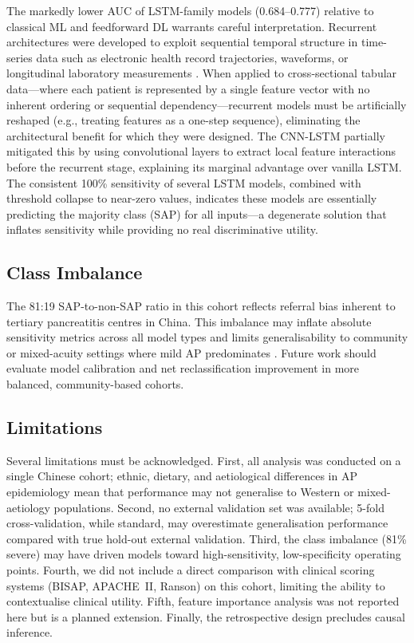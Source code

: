 \documentclass[12pt,a4paper]{article}
\begin{document}
The markedly lower AUC of LSTM-family models (0.684--0.777) relative to classical ML and feedforward DL warrants careful interpretation. Recurrent architectures were developed to exploit sequential temporal structure in time-series data such as electronic health record trajectories, waveforms, or longitudinal laboratory measurements \citep{Rajpurkar2022, Shickel2018}. When applied to cross-sectional tabular data—where each patient is represented by a single feature vector with no inherent ordering or sequential dependency—recurrent models must be artificially reshaped (e.g., treating features as a one-step sequence), eliminating the architectural benefit for which they were designed. The CNN-LSTM partially mitigated this by using convolutional layers to extract local feature interactions before the recurrent stage, explaining its marginal advantage over vanilla LSTM. The consistent 100\% sensitivity of several LSTM models, combined with threshold collapse to near-zero values, indicates these models are essentially predicting the majority class (SAP) for all inputs—a degenerate solution that inflates sensitivity while providing no real discriminative utility.

\subsection{Class Imbalance}

The 81:19 SAP-to-non-SAP ratio in this cohort reflects referral bias inherent to tertiary pancreatitis centres in China. This imbalance may inflate absolute sensitivity metrics across all model types and limits generalisability to community or mixed-acuity settings where mild AP predominates \citep{Lankisch2015}. Future work should evaluate model calibration and net reclassification improvement in more balanced, community-based cohorts.

\subsection{Limitations}

Several limitations must be acknowledged. First, all analysis was conducted on a single Chinese cohort; ethnic, dietary, and aetiological differences in AP epidemiology mean that performance may not generalise to Western or mixed-aetiology populations. Second, no external validation set was available; 5-fold cross-validation, while standard, may overestimate generalisation performance compared with true hold-out external validation. Third, the class imbalance (81\% severe) may have driven models toward high-sensitivity, low-specificity operating points. Fourth, we did not include a direct comparison with clinical scoring systems (BISAP, APACHE~II, Ranson) on this cohort, limiting the ability to contextualise clinical utility. Fifth, feature importance analysis was not reported here but is a planned extension. Finally, the retrospective design precludes causal inference.
\end{document}
